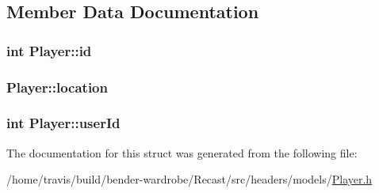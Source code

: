 \subsection{Member Data Documentation}
\hypertarget{struct_player_a05e05f3a23de78da7ec032ec2bcf8c6c}{
\subsubsection[{id}]{\setlength{\rightskip}{0pt plus 5cm}int Player\-::id}}\label{struct_player_a05e05f3a23de78da7ec032ec2bcf8c6c}
\hypertarget{struct_player_adfb7d7a2aa0757fa7bf5a570b74528db}{
\subsubsection[{location}]{ Player\-::location}}\label{struct_player_adfb7d7a2aa0757fa7bf5a570b74528db}
\hypertarget{struct_player_a5c801c5fa6666baddd65a2863cc6e7f2}{
\subsubsection[{user\-Id}]{\setlength{\rightskip}{0pt plus 5cm}int Player\-::user\-Id}}\label{struct_player_a5c801c5fa6666baddd65a2863cc6e7f2}


The documentation for this struct was generated from the following file\-:\begin{DoxyCompactItemize}
\item 
/home/travis/build/bender-\/wardrobe/\-Recast/src/headers/models/\hyperlink{_player_8h}{Player.\-h}\end{DoxyCompactItemize}
